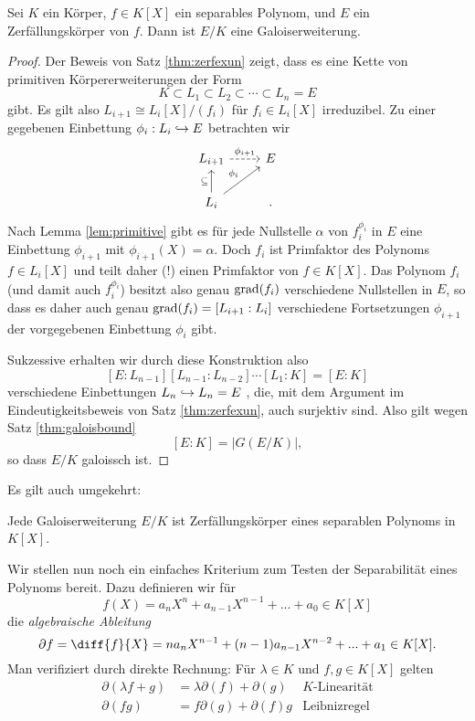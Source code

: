 \documentclass{book}
\begin{document}
\begin{thm}
    \label{thm:sepgalois}
    Sei $K$ ein Körper, $f \in K[X]$ ein separables Polynom, und $E$ ein
    Zerfällungskörper von $f$. Dann ist $E/K$ eine Galoiserweiterung. 
\end{thm}
\begin{proof}
    Der Beweis von Satz \ref{thm:zerfexun} zeigt, dass es eine Kette von
    primitiven Körpererweiterungen der Form 
    \[
        K \subset L_1 \subset L_2 \subset \cdots \subset L_n = E
    \]
    gibt. Es gilt also $L_{i+1} \cong L_i[X]/(f_i)$ für $f_i \in L_i[X]$
    irreduzibel. Zu einer gegebenen Einbettung $\phi_i: L_i \hra E$ betrachten
    wir
    \[
    \begin{tikzcd}
        L_{i+1}\ar[dashed]{r}{\phi_{i+1}} & E \\
        L_i \ar{ur}{\phi_i} \ar{u}{\subset}& .
    \end{tikzcd}
    \]
    Nach Lemma \ref{lem:primitive} gibt es für jede Nullstelle $\alpha$ von
    $f_i^{\phi_i}$ in $E$ eine Einbettung $\phi_{i+1}$ mit $\phi_{i+1}(X) =
    \alpha$. Doch $f_i$ ist Primfaktor des Polynoms $f \in L_i[X]$ und teilt
    daher (!) einen Primfaktor von $f \in K[X]$. Das Polynom $f_i$ (und damit
    auch $f_i^{\phi_i}$) besitzt also genau $\operatorname{grad}(f_i)$ verschiedene Nullstellen
    in $E$, so dass es daher auch genau $\operatorname{grad}(f_i) = [L_{i+1}:L_i]$
    verschiedene Fortsetzungen $\phi_{i+1}$ der vorgegebenen Einbettung
    $\phi_i$ gibt. 

    Sukzessive erhalten wir durch diese Konstruktion also 
    \[
        [E:L_{n-1}] [L_{n-1}:L_{n-2}] \cdots [L_1:K] = [E:K]
    \]
    verschiedene Einbettungen $L_n \hookrightarrow L_n = E$ , die, mit dem Argument im
    Eindeutigkeitsbeweis von Satz \ref{thm:zerfexun}, auch surjektiv sind. Also gilt
    wegen Satz \ref{thm:galoisbound}
    \[
           [E:K] = |G(E/K)|,
    \]
    so dass $E/K$ galoissch ist. 
\end{proof}

Es gilt auch umgekehrt:

\begin{prob}
    \label{prob:galois}
    Jede Galoiserweiterung $E/K$ ist Zerfällungskörper eines separablen Polynoms in $K[X]$. 
\end{prob}

Wir stellen nun noch ein einfaches Kriterium zum Testen der Separabilität eines Polynoms bereit. Dazu definieren wir für 
\[
    f(X) = a_n X^n + a_{n-1} X^{n-1} + ... + a_0 \in K[X]
\]
die \emph{algebraische Ableitung}
\[
    \partial f = \diff{f}{X} = n a_n X^{n-1} + (n-1) a_{n-1} X^{n-2} + ... + a_1 \in K[X].
\]
Man verifiziert durch direkte Rechnung: Für $\lambda \in K$ und $f,g \in K[X]$ gelten
\begin{align}
    \partial(\lambda f + g) & = \lambda \partial(f) + \partial(g) & \text{$K$-Linearität}\\
    \partial(fg) &= f \partial(g) + \partial(f)g & \text{Leibnizregel} \label{eq:leibniz}
\end{align}
\end{document}
